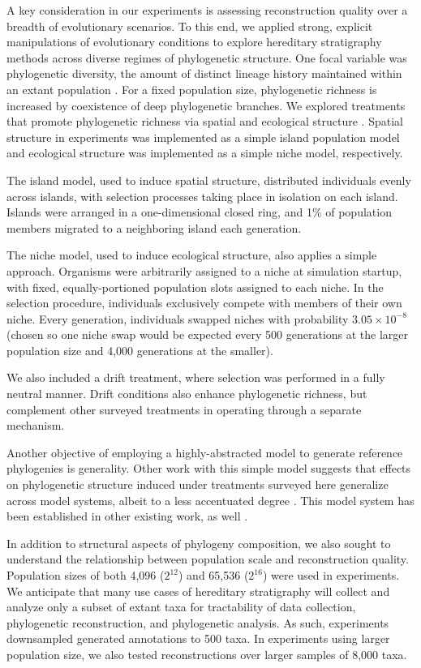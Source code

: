 A key consideration in our experiments is assessing reconstruction quality over a breadth of evolutionary scenarios.
To this end, we applied strong, explicit manipulations of evolutionary conditions to explore hereditary stratigraphy methods across diverse regimes of phylogenetic structure.
One focal variable was phylogenetic diversity, the amount of distinct lineage history maintained within an extant population \citep{tucker2017guide}.
For a fixed population size, phylogenetic richness is increased by coexistence of deep phylogenetic branches.
We explored treatments that promote phylogenetic richness via spatial and ecological structure \citep{moreno2024ecology,gomez2019understanding,valiente2007facilitation}.
Spatial structure in experiments was implemented as a simple island population model and ecological structure was implemented as a simple niche model, respectively.

The island model, used to induce spatial structure, distributed individuals evenly across islands, with selection processes taking place in isolation on each island.
Islands were arranged in a one-dimensional closed ring, and 1\% of population members migrated to a neighboring island each generation.

The niche model, used to induce ecological structure, also applies a simple approach.
Organisms were arbitrarily assigned to a niche at simulation startup, with fixed, equally-portioned population slots assigned to each niche.
In the selection procedure, individuals exclusively compete with members of their own niche.
Every generation, individuals swapped niches with probability $3.05 \times 10^{-8}$ (chosen so one niche swap would be expected every 500 generations at the larger population size and 4,000 generations at the smaller).

We also included a drift treatment, where selection was performed in a fully neutral manner.
Drift conditions also enhance phylogenetic richness, but complement other surveyed treatments in operating through a separate mechanism.

Another objective of employing a highly-abstracted model to generate reference phylogenies is generality.
Other work with this simple model suggests that effects on phylogenetic structure induced under treatments surveyed here generalize across model systems, albeit to a less accentuated degree \citep{moreno2024ecology}.
This model system has been established in other existing work, as well \citep{moreno2023toward}.

In addition to structural aspects of phylogeny composition, we also sought to understand the relationship between population scale and reconstruction quality.
Population sizes of both 4,096 ($2^{12}$) and 65,536 ($2^{16}$) were used in experiments.
We anticipate that many use cases of hereditary stratigraphy will collect and analyze only a subset of extant taxa for tractability of data collection, phylogenetic reconstruction, and phylogenetic analysis.
As such, experiments downsampled generated annotations to 500 taxa.
In experiments using larger population size, we also tested reconstructions over larger samples of 8,000 taxa.

